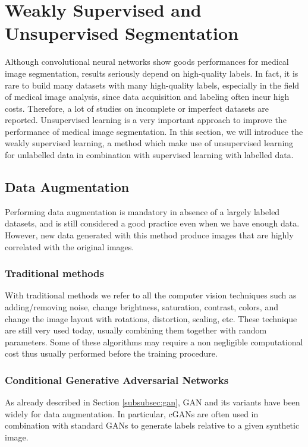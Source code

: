 \section{Weakly Supervised and Unsupervised Segmentation}
Although convolutional neural networks show goods performances for medical
image segmentation, results seriously depend on high-quality
labels. In fact, it is rare to build many datasets with many high-quality labels,
especially in the field of medical image analysis, since data acquisition and
labeling often incur high costs. Therefore, a lot of studies on incomplete or
imperfect datasets are reported. Unsupervised learning is a very important
approach to improve the performance of medical image segmentation. In this
section, we will introduce the weakly supervised learning, a method which make
use of unsupervised learning for unlabelled data in combination with supervised
learning with labelled data.

\subsection{Data Augmentation}
Performing data augmentation is mandatory in absence of a largely labeled datasets, and is still considered a good practice even when we have enough data. However, new data generated with this method produce images that are highly correlated with the original images.

\subsubsection{Traditional methods}
With traditional methods we refer to all the computer vision techniques such as adding/removing noise, change brightness, saturation, contrast, colors, and change the image layout with rotations, distortion, scaling, etc. These technique are still very used today, usually combining them together with random parameters. Some of these algorithms may require a non negligible computational cost thus usually performed before the training procedure.

\subsubsection{Conditional Generative Adversarial Networks}
As already described in Section \ref{subsubsec:gan}, GAN and its variants have been widely for data augmentation. In particular, cGANs are often used in combination with standard GANs to generate labels relative to a given synthetic image.

